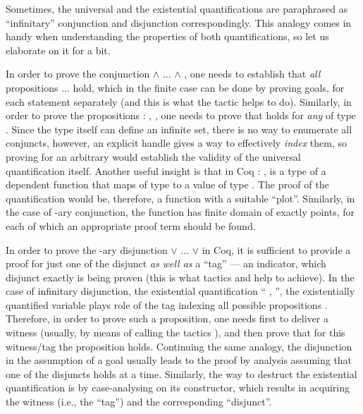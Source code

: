 Sometimes, the universal and the existential quantifications are
paraphrased as ``infinitary'' conjunction and disjunction
correspondingly. This analogy comes in handy when understanding the
properties of both quantifications, so let us elaborate on it for a bit.


In order to prove the conjunction  \ensuremath{\land} ... \ensuremath{\land} , one needs to
establish that \textit{all} propositions  ...  hold, which in the
finite case can be done by proving  goals, for each statement
separately (and this is what the  tactic helps to
do). Similarly, in order to prove the propositions \coqdockw{\ensuremath{\forall}} : ,  ,
one needs to prove that   holds for \textit{any}  of type . Since
the type  itself can define an infinite set, there is no way to
enumerate all conjuncts, however, an explicit handle  gives a way
to effectively \textit{index} them, so proving   for an arbitrary  would
establish the validity of the universal quantification itself. Another
useful insight is that in Coq \coqdockw{\ensuremath{\forall}} : ,   is a type of a
dependent function that maps  of type  to a value of type 
. The proof of the quantification would be, therefore, a function
with a suitable ``plot''. Similarly, in the case of -ary conjunction,
the function has finite domain of exactly  points, for each of
which an appropriate proof term should be found.


In order to prove the -ary disjunction  \ensuremath{\lor} ... \ensuremath{\lor}  in Coq, it
is sufficient to provide a proof for just one of the disjunct \textit{as well
as} a ``tag'' --- an indicator, which disjunct exactly is being proven
(this is what tactics  and  help to achieve). In the case
of infinitary disjunction, the existential quantification `` ,
 '', the existentially quantified variable plays role of the tag
indexing all possible propositions  . Therefore, in order to prove
such a proposition, one needs first to deliver a witness  (usually,
by means of calling the tactics ), and then prove that for
this witness/tag the proposition   holds. Continuing the same
analogy, the disjunction in the assumption of a goal usually leads to
the proof by  analysis assuming that one of the disjuncts holds
at a time. Similarly, the way to destruct the existential
quantification is by case-analysing on its constructor, which results
in acquiring the witness (i.e., the ``tag'') and the corresponding
``disjunct''.


